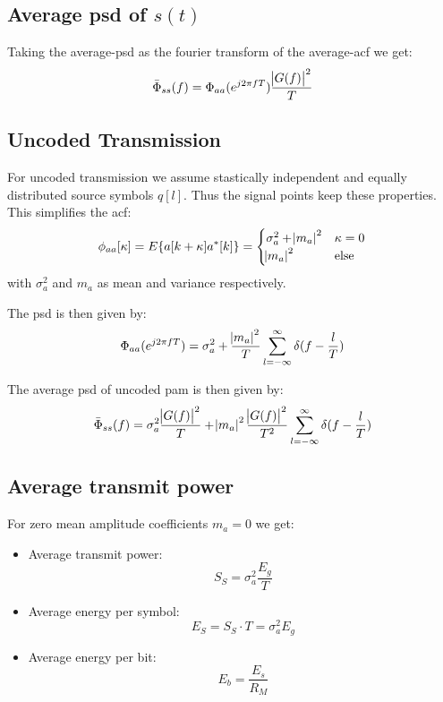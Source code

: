 \subsection{Average \acl{psd} of $s(t)$}
Taking the average-\ac{psd} as the fourier transform of the average-\ac{acf} we get:
\begin{equation}
    \bar{\Phi}_{ss}(f) = \Phi_{aa}(e^{j 2 \pi f T}) \frac{\abs{G(f)}^2}{T}
\end{equation}

\subsection{Uncoded Transmission}
For uncoded transmission we assume stastically independent and equally
distributed source symbols $q[l]$. Thus the signal points keep these properties.
This simplifies the \ac{acf}:
\begin{equation}
    \phi_{aa}[\kappa] = E\{a[k+\kappa]a^*[k]\} =
    \begin{cases}
        \sigma_a^2 + \abs{m_a}^2 & \kappa = 0 \\
        \abs{m_a}^2 & \text{else}
    \end{cases}
\end{equation}
with $\sigma_a^2$ and $m_a$ as mean and variance respectively.

The \ac{psd} is then given by:
\begin{equation}
    \Phi_{aa}(e^{j 2 \pi f T}) =
        \sigma_a^2 + \frac{\abs{m_a}^2}{T} \sum_{l=-\infty}^\infty \delta(f - \frac{l}{T})
\end{equation}

The average \ac{psd} of uncoded \ac{pam} is then given by:
\begin{equation}
    \bar{\Phi}_{ss}(f) =
        \sigma_a^2 \frac{\abs{G(f)}^2}{T} + \abs{m_a}^2\frac{\abs{G(f)}^2}{T^2} \sum_{l=-\infty}^\infty \delta(f - \frac{l}{T})
\end{equation}

\subsection{Average transmit power}
For zero mean amplitude coefficients $m_a=0$ we get:
\begin{itemize}
    \item Average transmit power:
        \begin{equation}
            S_S = \sigma_a^2 \frac{E_g}{T}
        \end{equation}
    \item Average energy per symbol:
        \begin{equation}
            E_S = S_S \cdot T = \sigma_a^2 E_g
        \end{equation}
    \item Average energy per bit:
        \begin{equation}
            E_b = \frac{E_s}{R_M}
        \end{equation}
\end{itemize}

